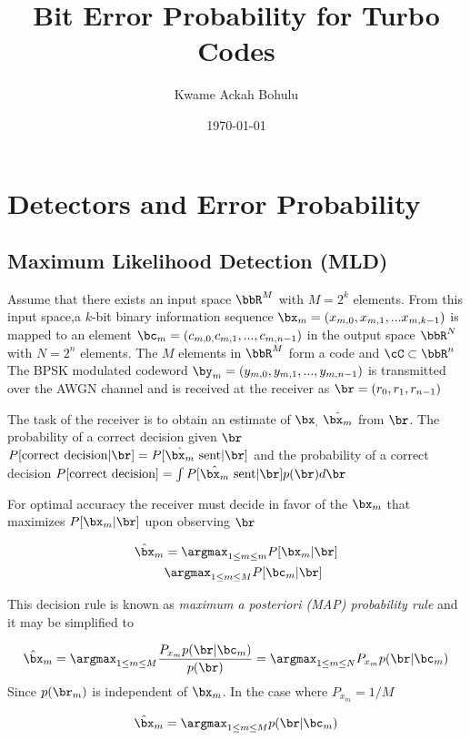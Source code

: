 \documentclass[11pt, oneside, dvipdfmx]{book}
\title{Bit Error Probability for Turbo Codes}
\author{Kwame Ackah Bohulu}
\date{\today}
\begin{document}
\maketitle
\chapter{Detectors and Error Probability}
\section{Maximum Likelihood Detection (MLD)}
Assume that there exists an input space $\bbR^M$ with $M=2^k $ elements. From this input space,a $k$-bit binary information sequence  $\bx_m =(x_{m,0},x_{m,1},...x_{m,k-1})$ is mapped to  an element $\bc_m =(c_{m,0,}c_{m,1},...,c_{m,n-1} )$ in the output space $\bbR^N$ with $N=2^n$ elements. The $M$ elements in $\bbR^M$ form a code and $\cC \subset \bbR^n$ The BPSK modulated codeword $\by_m=(y_{m,0},y_{m,1},...,y_{m,n-1})$ is transmitted over the AWGN channel and is received at the receiver as $\br =(r_{0},r_{1},r_{n-1})$

The task of the receiver is to obtain an estimate of $\bx_,~\hat{\bx_m}$ from $\br$. The probability of a correct decision given $\br$ $P[\text{correct decision} | \br] = P[\hat{\bx_m}~\text{sent} | \br]$ and the probability of a correct decision 
$P[\text{correct decision} ] = \int P[\hat{\bx_m}~\text{sent} | \br]p(\br) d\br$

For optimal accuracy the receiver must decide in favor of the $\bx_m$ that maximizes $P[\bx_m|\br]$ upon observing $\br$

\begin{equation}
\begin{split}
\hat{\bx}_m& = \argmax_{1 \leq m \leq m} P[\bx_m|\br]\\
& \argmax_{1 \leq m \leq M} P[\bc_m|\br]
\end{split}
\end{equation}

This decision rule is known as \textit{maximum a posteriori (MAP) probability rule} and it may be simplified to

\begin{equation}
\hat{\bx}_m=\argmax_{1 \leq m \leq M}\frac{ P_{x_m}p(\br|\bc_m)}{p(\br)} =\argmax_{1 \leq m \leq N}P_{x_m}p(\br|\bc_m)
\end{equation}
Since $p(\br_m)$ is independent of $\bx_m$. In the case where $P_{x_m}=1/M$


\begin{equation}
\hat{\bx}_m=\argmax_{1 \leq m \leq M}p(\br|\bc_m)
\label{3}
\end{equation}
\end{document}
